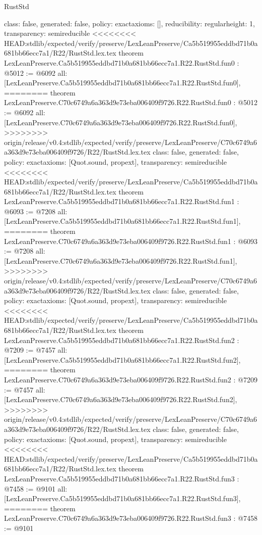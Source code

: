 \begin{lexlean}{RustStd}
\begin{coremodule}
{\begin{coremodule}
{{{  class: false,
  generated: false,
  policy: exact{axioms: []},
  reducibility: regular{height: 1},
  transparency: semireducible
}
<<<<<<<< HEAD:stdlib/expected/verify/preserve/LexLeanPreserve/Ca5b519955eddbd71b0a681bb66ecc7a1/R22/RustStd.lex.tex
theorem LexLeanPreserve.Ca5b519955eddbd71b0a681bb66ecc7a1.R22.RustStd.fun0 : @5012 := @6092 {
  all: [LexLeanPreserve.Ca5b519955eddbd71b0a681bb66ecc7a1.R22.RustStd.fun0],
========
theorem LexLeanPreserve.C70c6749a6a363d9e73eba006409f9726.R22.RustStd.fun0 : @5012 := @6092 {
  all: [LexLeanPreserve.C70c6749a6a363d9e73eba006409f9726.R22.RustStd.fun0],
>>>>>>>> origin/release/v0.4:stdlib/expected/verify/preserve/LexLeanPreserve/C70c6749a6a363d9e73eba006409f9726/R22/RustStd.lex.tex
  class: false,
  generated: false,
  policy: exact{axioms: [Quot.sound, propext]},
  transparency: semireducible
}
<<<<<<<< HEAD:stdlib/expected/verify/preserve/LexLeanPreserve/Ca5b519955eddbd71b0a681bb66ecc7a1/R22/RustStd.lex.tex
theorem LexLeanPreserve.Ca5b519955eddbd71b0a681bb66ecc7a1.R22.RustStd.fun1 : @6093 := @7208 {
  all: [LexLeanPreserve.Ca5b519955eddbd71b0a681bb66ecc7a1.R22.RustStd.fun1],
========
theorem LexLeanPreserve.C70c6749a6a363d9e73eba006409f9726.R22.RustStd.fun1 : @6093 := @7208 {
  all: [LexLeanPreserve.C70c6749a6a363d9e73eba006409f9726.R22.RustStd.fun1],
>>>>>>>> origin/release/v0.4:stdlib/expected/verify/preserve/LexLeanPreserve/C70c6749a6a363d9e73eba006409f9726/R22/RustStd.lex.tex
  class: false,
  generated: false,
  policy: exact{axioms: [Quot.sound, propext]},
  transparency: semireducible
}
<<<<<<<< HEAD:stdlib/expected/verify/preserve/LexLeanPreserve/Ca5b519955eddbd71b0a681bb66ecc7a1/R22/RustStd.lex.tex
theorem LexLeanPreserve.Ca5b519955eddbd71b0a681bb66ecc7a1.R22.RustStd.fun2 : @7209 := @7457 {
  all: [LexLeanPreserve.Ca5b519955eddbd71b0a681bb66ecc7a1.R22.RustStd.fun2],
========
theorem LexLeanPreserve.C70c6749a6a363d9e73eba006409f9726.R22.RustStd.fun2 : @7209 := @7457 {
  all: [LexLeanPreserve.C70c6749a6a363d9e73eba006409f9726.R22.RustStd.fun2],
>>>>>>>> origin/release/v0.4:stdlib/expected/verify/preserve/LexLeanPreserve/C70c6749a6a363d9e73eba006409f9726/R22/RustStd.lex.tex
  class: false,
  generated: false,
  policy: exact{axioms: [Quot.sound, propext]},
  transparency: semireducible
}
<<<<<<<< HEAD:stdlib/expected/verify/preserve/LexLeanPreserve/Ca5b519955eddbd71b0a681bb66ecc7a1/R22/RustStd.lex.tex
theorem LexLeanPreserve.Ca5b519955eddbd71b0a681bb66ecc7a1.R22.RustStd.fun3 : @7458 := @9101 {
  all: [LexLeanPreserve.Ca5b519955eddbd71b0a681bb66ecc7a1.R22.RustStd.fun3],
========
theorem LexLeanPreserve.C70c6749a6a363d9e73eba006409f9726.R22.RustStd.fun3 : @7458 := @9101 {
}}}}}}}
\end{coremodule}}
\end{coremodule}
\end{lexlean}
